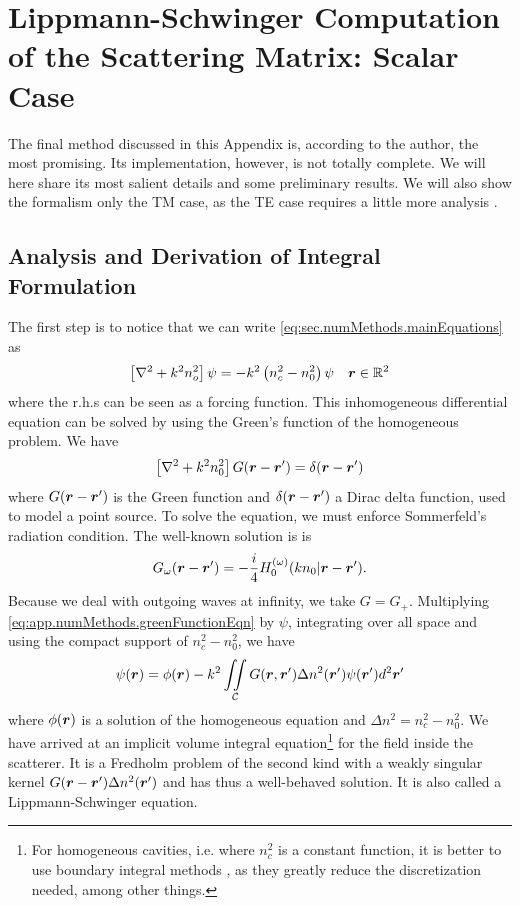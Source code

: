 \section{Lippmann-Schwinger Computation of the Scattering Matrix: Scalar Case}\label{sec:app.numTools.lippmannSchwinger}
The final method discussed in this Appendix is, according to the author, the most
promising. Its implementation, however, is not totally complete. We will here share 
its most salient details and some preliminary results. We will also show the formalism
only the TM case, as the TE case requires a little more analysis \cite{MAR2003}. 

\subsection{Analysis and Derivation of Integral Formulation}
The first step is to notice that we can write \eqref{eq:sec.numMethods.mainEquations} as 
	\begin{align}
		\left[\nabla^2+k^2n_o^2\right]\psi &= -k^2\left(n_c^2-n_0^2\right)\psi & \boldsymbol{r}\in\mathbb{R}^2
	\end{align}
where the r.h.s can be seen as a forcing function. This inhomogeneous differential
equation can be solved by using the Green's function of the homogeneous
problem. We have
	\begin{equation}
		\label{eq:app.numMethods.greenFunctionEqn}
		\left[\nabla^2+k^2n_0^2\right]G(\boldsymbol{r}-\boldsymbol{r}')=\delta(\boldsymbol{r}-\boldsymbol{r}')
	\end{equation}
where $G(\boldsymbol{r}-\boldsymbol{r}')$ is the Green function and
$\delta(\boldsymbol{r}-\boldsymbol{r}')$ a Dirac delta function, used to model
a point source. To solve the equation, we must enforce Sommerfeld's
radiation condition. The well-known solution is \cite{GAG2012} is
	\begin{equation}
		G_\omega(\boldsymbol{r}-\boldsymbol{r}') = -\frac{i}{4}H_0^{(\omega)}(kn_0|\boldsymbol{r}-\boldsymbol{r}').
	\end{equation}
Because we deal with outgoing waves at infinity, we take $G=G_+$. 
Multiplying \eqref{eq:app.numMethods.greenFunctionEqn} by $\psi$, 
integrating over all space and using the compact support of 
$n_c^2-n_0^2$, we have
	\begin{equation}
		\psi(\boldsymbol{r}) = \phi(\boldsymbol{r}) - k^2\mathop{\iint}_\mathcal{C} G(\boldsymbol{r},\boldsymbol{r}')\Delta n^2(\boldsymbol{r}')\psi(\boldsymbol{r}')d^2\boldsymbol{r}'
	\end{equation}
where $\phi(\boldsymbol{r})$ is a solution of the homogeneous equation and $\Delta n^2=n_c^2-n_0^2$. 
We have arrived at an implicit volume integral equation\footnote{For homogeneous cavities, i.e. where
$n_c^2$ is a constant function, it is better to use boundary integral methods \cite{WIE2003,BOR2004}, as they greatly reduce
the discretization needed, among other things.} for the field inside the scatterer. 
It is a Fredholm problem of the second kind with a weakly singular kernel $G(\boldsymbol{r}-\boldsymbol{r}')\Delta n^2(\boldsymbol{r}')$ 
\cite{DEL1985} and has thus a well-behaved solution. It is also called a Lippmann-Schwinger equation. 

